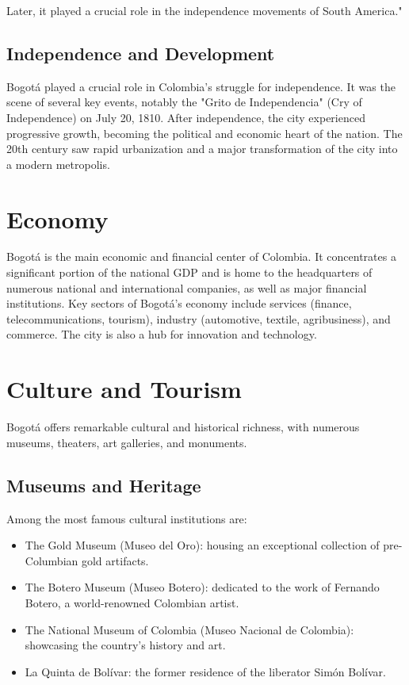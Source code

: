 \documentclass{article}
\begin{document}
Later, it played a crucial role in the independence movements of South America."

\subsection{Independence and Development}
Bogotá played a crucial role in Colombia's struggle for independence. It was the scene of several key events, notably the "Grito de Independencia" (Cry of Independence) on July 20, 1810. After independence, the city experienced progressive growth, becoming the political and economic heart of the nation. The 20th century saw rapid urbanization and a major transformation of the city into a modern metropolis.

\section{Economy}
Bogotá is the main economic and financial center of Colombia. It concentrates a significant portion of the national GDP and is home to the headquarters of numerous national and international companies, as well as major financial institutions. Key sectors of Bogotá's economy include services (finance, telecommunications, tourism), industry (automotive, textile, agribusiness), and commerce. The city is also a hub for innovation and technology.

\section{Culture and Tourism}
Bogotá offers remarkable cultural and historical richness, with numerous museums, theaters, art galleries, and monuments.

\subsection{Museums and Heritage}
Among the most famous cultural institutions are:
\begin{itemize}
    \item The Gold Museum (Museo del Oro): housing an exceptional collection of pre-Columbian gold artifacts.
    \item The Botero Museum (Museo Botero): dedicated to the work of Fernando Botero, a world-renowned Colombian artist.
    \item The National Museum of Colombia (Museo Nacional de Colombia): showcasing the country's history and art.
    \item La Quinta de Bolívar: the former residence of the liberator Simón Bolívar.
\end{itemize}
\end{document}

